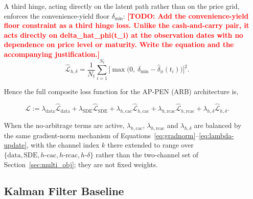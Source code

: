 \documentclass[11pt, a4paper]{article}
\newcommand{\todo}[1]{\textcolor{red}{\textbf{[TODO: #1]}}}
\begin{document}
A third hinge, acting directly on the latent path rather than on the price grid, enforces the convenience-yield floor $\delta_{\min}$:
\todo{Add the convenience-yield floor constraint as a third hinge loss.
  Unlike the cash-and-carry pair, it acts directly on delta\_hat\_phi(t\_i) at the
  observation dates with no dependence on price level or maturity. Write the
  equation and the accompanying justification.}
\begin{equation}
\hat{\mathcal{L}}_{h,\delta} = \frac{1}{N_t} \sum_{i=1}^{N_t}
\Big[ \max\!\Big( 0,\ \delta_{\min} - \hat{\delta}_\phi(t_i) \Big) \Big]^2.
\label{eq:delta-floor-loss}
\end{equation}

Hence the full composite loss function for the AP-PEN (ARB) architecture is,

\begin{equation}
\hat{\mathcal{L}} :=
\lambda_{\text{data}} \hat{\mathcal{L}}_{\text{data}}
+ \lambda_{\text{SDE}} \hat{\mathcal{L}}_{\text{SDE}}
+ \lambda_{h,\text{cac}} \hat{\mathcal{L}}_{h,\text{cac}}
+ \lambda_{h,\text{rcac}} \hat{\mathcal{L}}_{h,\text{rcac}}
+ \lambda_{h,\delta} \hat{\mathcal{L}}_{h,\delta}.
\label{eq:composite-full}
\end{equation}

When the no-arbitrage terms are active, $\lambda_{h,\text{cac}}$, $\lambda_{h,\text{rcac}}$ and $\lambda_{h,\delta}$ are balanced by the same gradient-norm mechanism of Equations~\ref{eq:gradnorm}--\ref{eq:lambda-update}, with the channel index $k$ there extended to range over $\{\text{data}, \text{SDE}, h\text{-cac}, h\text{-rcac}, h\text{-}\delta\}$ rather than the two-channel set of Section~\ref{sec:multi_obj}; they are not fixed weights.


\subsection{Kalman Filter Baseline}
\label{sec:kalman}
\end{document}
